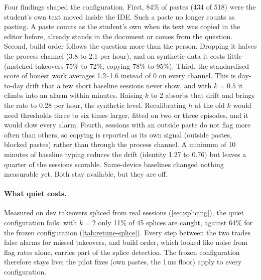 Four findings shaped the configuration. First, 84\% of pastes (434 of 518) were the
student's own text moved inside the IDE. Such a paste no longer counts as pasting. A paste
counts as the student's own when its text was copied in the editor before, already stands
in the document or comes from the question. Second, build order follows the question more
than the person. Dropping it halves the process channel (3.8 to 2.1 per hour), and on
synthetic data it costs little (matched takeovers 75\% to 72\%, copying 78\% to 95\%).
Third, the standardised score of honest work averages 1.2--1.6 instead of 0 on every
channel. This is day-to-day drift that a few short baseline sessions never show, and with
$k=0.5$ it climbs into an alarm within minutes. Raising $k$ to 2 absorbs that drift and
brings the rate to 0.28 per hour, the synthetic level. Recalibrating $h$ at the old $k$
would need thresholds three to six times larger, fitted on two or three episodes, and it
would slow every alarm. Fourth, sessions with an outside paste do not flag more often than
others, so copying is reported as its own signal (outside pastes, blocked pastes) rather
than through the process channel. A minimum of 10 minutes of baseline typing reduces the
drift (identity 1.27 to 0.76) but leaves a quarter of the sessions scorable. Same-device
baselines changed nothing measurable yet. Both stay available, but they are off.

\paragraph{What quiet costs.} Measured on dev takeovers spliced from real sessions
(\cref{sec:splicing}), the quiet configuration fails: with $k=2$ only 11\% of 45 splices
are caught, against 64\% for the frozen configuration (\cref{tab:retune-splice}). Every
step between the two trades false alarms for missed takeovers, and build order, which looked
like noise from flag rates alone, carries part of the splice detection. The frozen
configuration therefore stays live; the pilot fixes (own pastes, the 1\,ms floor) apply to
every configuration.

